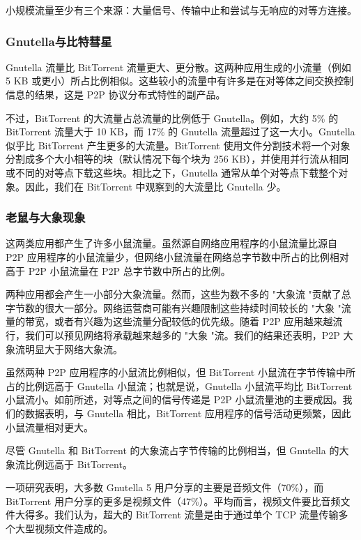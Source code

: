 小规模流量至少有三个来源：大量信号、传输中止和尝试与无响应的对等方连接。

\subsubsection{Gnutella与比特彗星}

Gnutella 流量比 BitTorrent 流量更大、更分散。这两种应用生成的小流量（例如 5 KB 或更小）所占比例相似。这些较小的流量中有许多是在对等体之间交换控制信息的结果，这是 P2P 协议分布式特性的副产品。

不过，BitTorrent 的大流量占总流量的比例低于 Gnutella。例如，大约 5\% 的 BitTorrent 流量大于 10 KB，而 17\% 的 Gnutella 流量超过了这一大小。Gnutella 似乎比 BitTorrent 产生更多的大流量。BitTorrent 使用文件分割技术将一个对象分割成多个大小相等的块（默认情况下每个块为 256 KB），并使用并行流从相同或不同的对等点下载这些块。相比之下，Gnutella 通常从单个对等点下载整个对象。因此，我们在 BitTorrent 中观察到的大流量比 Gnutella 少。

\subsubsection{老鼠与大象现象}

这两类应用都产生了许多小鼠流量。虽然源自网络应用程序的小鼠流量比源自 P2P 应用程序的小鼠流量少，但网络小鼠流量在网络总字节数中所占的比例相对高于 P2P 小鼠流量在 P2P 总字节数中所占的比例。

两种应用都会产生一小部分大象流量。然而，这些为数不多的 "大象流 "贡献了总字节数的很大一部分。网络运营商可能有兴趣限制这些持续时间较长的 "大象 "流量的带宽，或者有兴趣为这些流量分配较低的优先级。随着 P2P 应用越来越流行，我们可以预见网络将承载越来越多的 "大象 "流。我们的结果还表明，P2P 大象流明显大于网络大象流。

虽然两种 P2P 应用程序的小鼠流比例相似，但 BitTorrent 小鼠流在字节传输中所占的比例远高于 Gnutella 小鼠流；也就是说，Gnutella 小鼠流平均比 BitTorrent 小鼠流小。如前所述，对等点之间的信号传递是 P2P 小鼠流量池的主要成因。我们的数据表明，与 Gnutella 相比，BitTorrent 应用程序的信号活动更频繁，因此小鼠流量相对更大。

尽管 Gnutella 和 BitTorrent 的大象流占字节传输的比例相当，但 Gnutella 的大象流比例远高于 BitTorrent。

一项研究表明，大多数 Gnutella 5 用户分享的主要是音频文件（70\%），而 BitTorrent 用户分享的更多是视频文件（47\%）。平均而言，视频文件要比音频文件大得多。我们认为，超大的 BitTorrent 流量是由于通过单个 TCP 流量传输多个大型视频文件造成的。

